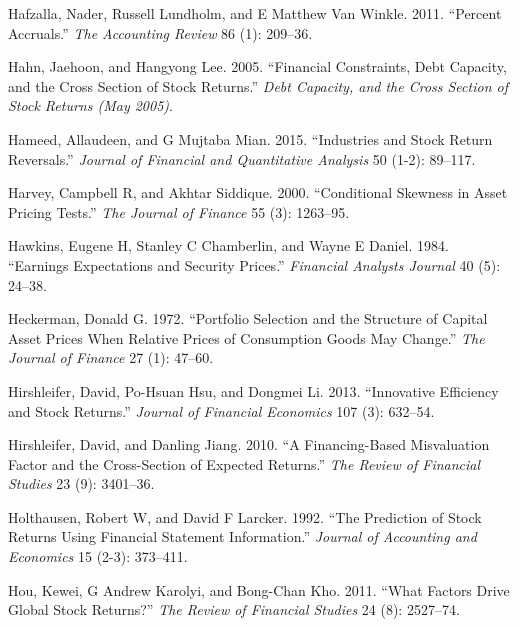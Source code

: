 \documentclass[
  letterpaper,
  DIV=11,
  numbers=noendperiod]{scrreprt}
\newlength{\cslhangindent}
\newlength{\cslentryspacingunit} %
\newenvironment{CSLReferences}[2] %
 {%
  \setlength{\parindent}{0pt}
  \ifodd #1
  \let\oldpar\par
  \def\par{\hangindent=\cslhangindent\oldpar}
  \fi
  \setlength{\parskip}{#2\cslentryspacingunit}
 }%
 {}
\begin{document}
\begin{CSLReferences}{1}{0}
\leavevmode{}%
Hafzalla, Nader, Russell Lundholm, and E Matthew Van Winkle. 2011.
{``Percent Accruals.''} \emph{The Accounting Review} 86 (1): 209--36.

\leavevmode{}%
Hahn, Jaehoon, and Hangyong Lee. 2005. {``Financial Constraints, Debt
Capacity, and the Cross Section of Stock Returns.''} \emph{Debt
Capacity, and the Cross Section of Stock Returns (May 2005)}.

\leavevmode{}%
Hameed, Allaudeen, and G Mujtaba Mian. 2015. {``Industries and Stock
Return Reversals.''} \emph{Journal of Financial and Quantitative
Analysis} 50 (1-2): 89--117.

\leavevmode{}%
Harvey, Campbell R, and Akhtar Siddique. 2000. {``Conditional Skewness
in Asset Pricing Tests.''} \emph{The Journal of Finance} 55 (3):
1263--95.

\leavevmode{}%
Hawkins, Eugene H, Stanley C Chamberlin, and Wayne E Daniel. 1984.
{``Earnings Expectations and Security Prices.''} \emph{Financial
Analysts Journal} 40 (5): 24--38.

\leavevmode{}%
Heckerman, Donald G. 1972. {``Portfolio Selection and the Structure of
Capital Asset Prices When Relative Prices of Consumption Goods May
Change.''} \emph{The Journal of Finance} 27 (1): 47--60.

\leavevmode{}%
Hirshleifer, David, Po-Hsuan Hsu, and Dongmei Li. 2013. {``Innovative
Efficiency and Stock Returns.''} \emph{Journal of Financial Economics}
107 (3): 632--54.

\leavevmode{}%
Hirshleifer, David, and Danling Jiang. 2010. {``A Financing-Based
Misvaluation Factor and the Cross-Section of Expected Returns.''}
\emph{The Review of Financial Studies} 23 (9): 3401--36.

\leavevmode{}%
Holthausen, Robert W, and David F Larcker. 1992. {``The Prediction of
Stock Returns Using Financial Statement Information.''} \emph{Journal of
Accounting and Economics} 15 (2-3): 373--411.

\leavevmode{}%
Hou, Kewei, G Andrew Karolyi, and Bong-Chan Kho. 2011. {``What Factors
Drive Global Stock Returns?''} \emph{The Review of Financial Studies} 24
(8): 2527--74.


\end{CSLReferences}
\end{document}
